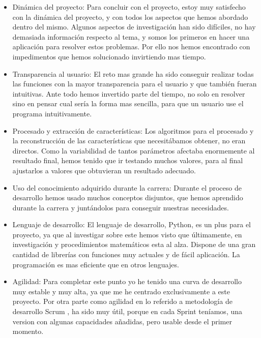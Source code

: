 \begin{itemize}
\item Dinámica del proyecto: Para concluir con el proyecto, estoy muy satisfecho con la dinámica del proyecto, y con todos los aspectos que hemos abordado dentro del mismo.
Algunos aspectos de investigación han sido difíciles, no hay demasiada información respecto al tema, y somos los primeros en hacer una aplicación para resolver estos problemas. Por ello nos hemos encontrado con impedimentos que hemos solucionado invirtiendo mas tiempo.

\item Transparencia al usuario: El reto mas grande ha sido conseguir realizar todas las funciones con la mayor transparencia para el usuario y que también fueran intuitivas. Ante todo hemos invertido parte del tiempo, no solo en resolver sino en pensar cual sería la forma mas sencilla, para que un usuario use el programa intuitivamente. 

\item Procesado y extracción de características: Los algoritmos para el procesado y la reconstrucción de las características que necesitábamos obtener, no eran directos. Como la variabilidad de tantos parámetros afectaba enormemente al resultado final, hemos tenido que ir testando muchos valores, para al final ajustarlos a valores que obtuvieran un resultado adecuado.

\item Uso del conocimiento adquirido durante la carrera: Durante el proceso de desarrollo hemos usado muchos conceptos disjuntos, que hemos aprendido durante la carrera y juntándolos para conseguir nuestras necesidades.

\item Lenguaje de desarrollo: El lenguaje de desarrollo, Python, es un plus para el proyecto, ya que al investigar sobre este hemos visto que últimamente, en investigación y procedimientos matemáticos esta al alza. Dispone de una gran cantidad de librerías con funciones muy actuales y de fácil aplicación. La programación es mas eficiente que en otros lenguajes.

\item Agilidad: Para completar este punto yo he tenido una curva de desarrollo muy estable y muy alta, ya que me he centrado exclusivamente a este proyecto.
Por otra parte como agilidad en lo referido a metodología de desarrollo Scrum \cite{Scrum}, ha sido muy útil, porque en cada Sprint teníamos, una version con algunas capacidades añadidas, pero usable desde el primer momento.


\end{itemize}
